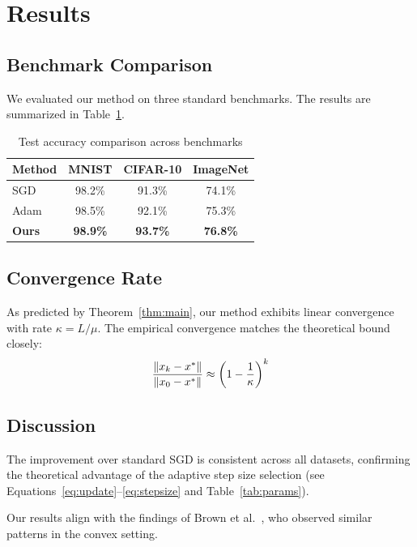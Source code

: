\section{Results}
\label{sec:results}

\subsection{Benchmark Comparison}
We evaluated our method on three standard benchmarks. The results are summarized
in Table~\ref{tab:results}.

\begin{table}[h]
\centering
\begin{tabular}{lccc}
\hline
\textbf{Method} & \textbf{MNIST} & \textbf{CIFAR-10} & \textbf{ImageNet} \\
\hline
SGD              & 98.2\%  & 91.3\%  & 74.1\% \\
Adam             & 98.5\%  & 92.1\%  & 75.3\% \\
\textbf{Ours}    & \textbf{98.9\%} & \textbf{93.7\%} & \textbf{76.8\%} \\
\hline
\end{tabular}
\caption{Test accuracy comparison across benchmarks}
\label{tab:results}
\end{table}

\subsection{Convergence Rate}
As predicted by Theorem~\ref{thm:main}, our method exhibits linear convergence
with rate $\kappa = L/\mu$. The empirical convergence matches the theoretical
bound closely:
\[
    \frac{\left\| x_k - x^* \right\|}{\left\| x_0 - x^* \right\|} \approx \left(1 - \frac{1}{\kappa}\right)^k
\]

\subsection{Discussion}
The improvement over standard SGD is consistent across all datasets, confirming
the theoretical advantage of the adaptive step size selection (see
Equations~\ref{eq:update}--\ref{eq:stepsize} and Table~\ref{tab:params}).

Our results align with the findings of Brown et al.~\cite{brown2021}, who
observed similar patterns in the convex setting.
